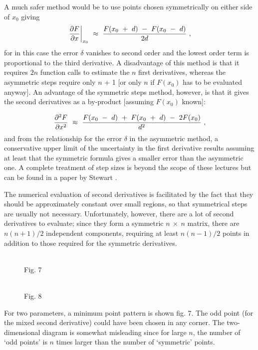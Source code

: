      A much safer method would be to use points chosen symmetrically
on either side of $x_0$ giving
 $$\left .{\partial F\over \partial x}\right|_{x_{0}}~\approx~{F(x_0~+~d)~-~F(x_0~-~d)\over
2d}~,$$ for in this case the error  $\delta$ vanishes to second order and the lowest
order term is proportional to the third derivative. A disadvantage of
this method is that it requires $2n$ function calls to estimate the $n$ first
derivatives, whereas the asymmetric steps require only $n$ + 1 [or only $n$ if
$F(x_0)$ has to be evaluated anyway].  An advantage of the symmetric steps
method, however, is that it gives the second derivatives as a
by-product [assuming $F(x_0)$ known]:
 
 $${\partial^{2} F\over \partial x^{2}}~\approx~{F(x_0~-~d)~+~F(x_0~+~d)~-~2F(x_{0})\over d^{2}}~,$$
and from the relationship for the error $\delta$ in the asymmetric method,
 a conservative upper limit of the uncertainty in the first derivative
results assuming at least that the symmetric formula gives a smaller
error than the asymmetric one.  A complete treatment of step sizes is
beyond the scope of these lectures but can be found in a paper by
Stewart \cite{Stew}.
 
     The numerical evaluation of second derivatives is facilitated by
the fact that they should be approximately constant over small regions,
so that symmetrical steps are usually not necessary.  Unfortunately,
however, there are a lot of second derivatives to evaluate;  since they
form a symmetric $n~\times~n$ matrix, there are $n(n + 1)/2$ independent
components, requiring at least $n(n - 1)/2$ points  in addition to those
 required for the symmetric derivatives.
\begin{figure}
\begin{minipage}[b]{.49\textwidth}
\begin{center}\mbox{}\\
Fig. 7
\end{center}
\end{minipage} \hfill
\begin{minipage}[b]{.49\textwidth}
\begin{center}\mbox{}\\
Fig. 8
\end{center}
\end{minipage} \hfill
\end{figure}
 For two parameters, a minimum
  point pattern is shown fig. 7. The odd point (for
 the mixed second derivative) could
 have been chosen in any corner. The
 two-dimensional diagram is somewhat
 misleading since for large $n$, the
number of `odd points' is $n$ times
  larger than the number of `symmetric' points.
 
